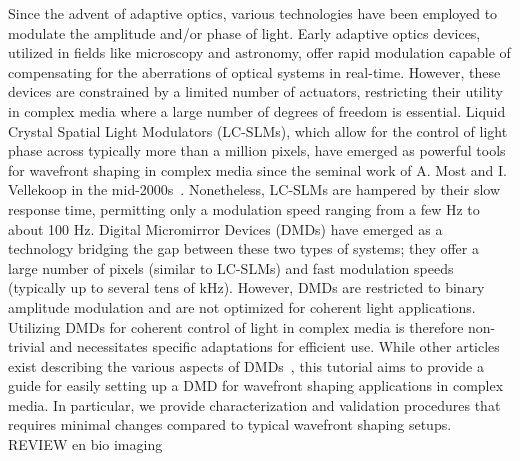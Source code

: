 \documentclass[12pt]{iopart}
\begin{document}
Since the advent of adaptive optics, various technologies have been employed
to modulate the amplitude and/or phase of light.
Early adaptive optics devices, utilized in fields like microscopy and astronomy,
offer rapid modulation capable of compensating for the aberrations of optical systems
in real-time.
However, these devices are constrained by a limited number of actuators,
restricting their utility in complex media where a large number of degrees of freedom is essential.
Liquid Crystal Spatial Light Modulators (LC-SLMs),
which allow for the control of light phase across typically more than a million pixels,
have emerged as powerful tools for wavefront shaping in complex media
since the seminal work of A. Most and I. Vellekoop in the mid-2000s~\cite{Vellekoop2007focusing}.
Nonetheless, LC-SLMs are hampered by their slow response time,
permitting only a modulation speed ranging from a few Hz to about 100 Hz.
Digital Micromirror Devices (DMDs) have emerged as a technology bridging the gap
between these two types of systems;
they offer a large number of pixels (similar to LC-SLMs) and fast modulation speeds (typically up to several tens of kHz).
However, DMDs are restricted to binary amplitude modulation and are not optimized for coherent light applications.
Utilizing DMDs for coherent control of light in complex media is therefore non-trivial
and necessitates specific adaptations for efficient use.
While other articles exist describing the various aspects of DMDs~\cite{Park2015properties, Cox2021converting, Wang2023diffraction},
this tutorial aims to provide a guide for easily setting up a DMD for wavefront shaping applications in complex media.
In particular, we provide characterization and validation procedures that requires minimal changes compared to typical wavefront shaping setups.\\

REVIEW en bio imaging~\cite{Zhuang2020}
\end{document}
